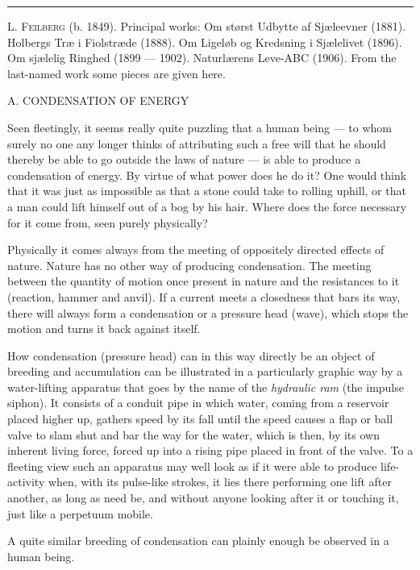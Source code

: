 \documentclass[12pt,a4paper,openany]{book}
\newcommand{\opage}[1]{\marginnote{\footnotesize\textit{[#1]}}}
\newcommand{\excerpthead}[1]{\par\bigskip\begin{center}#1\end{center}\nopagebreak\smallskip}
\newenvironment{intro}{\par}{\par}
\newcommand{\sectionrule}{\par\begin{center}\rule{4em}{0.4pt}\end{center}}
\begin{document}
\sectionrule

\begin{intro}

\textsc{L. Feilberg} (b. 1849). Principal works: Om størst Udbytte af
Sjæleevner (1881). Holbergs Træ i Fiolstræde (1888). Om Ligeløb
og Kredsning i Sjælelivet (1896). Om sjælelig Ringhed (1899
--- 1902). Naturlærens Leve-ABC (1906). From the last-named work
some pieces are given here.
\end{intro}

\excerpthead{A. CONDENSATION OF ENERGY}


Seen fleetingly, it seems really quite puzzling that a
human being --- to whom surely no one any longer thinks of attributing
such a free will that he should thereby be able to go
\setcounter{footnote}{0}%
\opage{289}outside the laws of nature --- is able to produce a condensation of energy.
By virtue of what power does he do it? One would
think that it was just as impossible as that a stone could take
to rolling uphill, or that a man could lift himself
out of a bog by his hair. Where does the force necessary for it
come from, seen purely physically?

Physically it comes always from the meeting of
oppositely directed effects of nature. Nature has no other way
of producing condensation. The meeting between the quantity of motion once
present in nature and the resistances
to it (reaction, hammer and anvil). If
a current meets a closedness that bars its way, there will
always form a condensation or a pressure head (wave),
which stops the motion and turns it back against itself.

How condensation (pressure head) can in this way directly
be an object of breeding and accumulation can be illustrated
in a particularly graphic way by a water-lifting apparatus
that goes by the name of the \emph{hydraulic ram} (the impulse siphon).
It consists of a conduit pipe in which water, coming
from a reservoir placed higher up, gathers speed by its fall
until the speed causes a flap or ball valve to slam shut
and bar the way for the water, which is then, by its own inherent
living force, forced up into a rising pipe placed in front of the valve.
To a fleeting view such an apparatus may well look
as if it were able to produce life-activity when,
with its pulse-like strokes, it lies there performing one
lift after another, as long as need be, and without anyone
looking after it or touching it, just like a perpetuum mobile.

A quite similar breeding of condensation can plainly enough
be observed in a human being.
\end{document}

